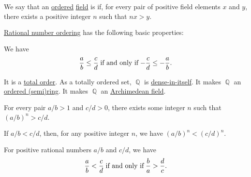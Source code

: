 \begin{definition}\label{def:archimedean_field}
  We say that an \hyperref[def:ordered_semiring]{ordered} \hyperref[def:field]{field} is  if, for every pair of positive field elements \( x \) and \( y \), there exists a positive integer \( n \) such that \( nx > y \).
\end{definition}

\begin{proposition}\label{thm:def:rational_numbers_ordering}
  \hyperref[def:rational_numbers_ordering]{Rational number ordering} has the following basic properties:
  \begin{thmenum}
     We have
    \begin{equation*}
      \frac a b \leq \frac c d \T{if and only if} -\frac c d \leq -\frac a b.
    \end{equation*}

     It is a \hyperref[def:totally_ordered_set]{total order}.
     As a totally ordered set, \( \BbbQ \) is \hyperref[def:dense_total_order]{dense-in-itself}.
     It makes \( \BbbQ \) an \hyperref[def:ordered_semiring]{ordered (semi)ring}.
     It makes \( \BbbQ \) an \hyperref[def:archimedean_field]{Archimedean field}.

     For every pair \( a / b > 1 \) and \( c / d > 0 \), there exists some integer \( n \) such that \( (a / b)^n > c / d \).

     If \( a / b < c / d \), then, for any positive integer \( n \), we have \( (a / b)^n < (c / d)^n \).

     For positive rational numbers \( a / b \) and \( c / d \), we have
    \begin{equation}\label{eq:thm:def:rational_numbers_ordering/reciprocal}
      \frac a b < \frac c d \T{if and only if} \frac b a > \frac d c.
    \end{equation}
  \end{thmenum}
\end{proposition}
